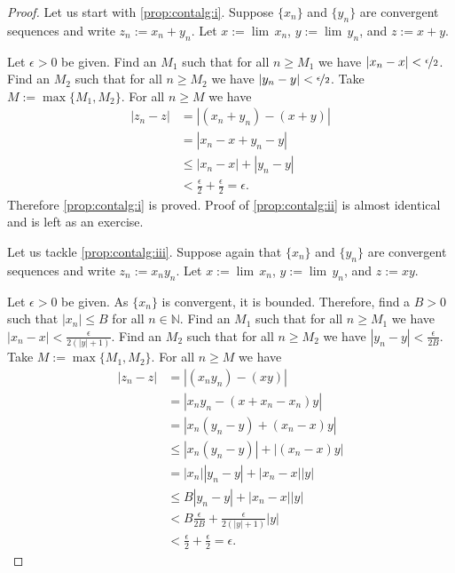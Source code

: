 \documentclass[12pt]{book}
\newcommand{\abs}[1]{\left\lvert {#1} \right\rvert}
\newcommand{\N}{{\mathbb{N}}}
\theoremstyle{plain}
\theoremstyle{remark}
\theoremstyle{definition}
\theoremstyle{exercise}
\theoremstyle{example}
\begin{document}
\begin{proof}
Let us start with \ref{prop:contalg:i}.
Suppose $\{ x_n \}$ and $\{ y_n \}$ are convergent sequences and
write $z_n := x_n + y_n$.  Let $x := \lim\, x_n$,
$y := \lim\, y_n$, and $z := x+y$.

Let $\epsilon > 0$ be given.  
Find an $M_1$ such that for all $n \geq M_1$
we have
$\abs{x_n - x} < \nicefrac{\epsilon}{2}$.  
Find an $M_2$ such that for all $n \geq M_2$
we have
$\abs{y_n - y} < \nicefrac{\epsilon}{2}$.  Take $M := \max \{ M_1, M_2 \}$.
For all $n \geq M$ we have
\begin{equation*}
\begin{split}
\abs{z_n - z} &=
\abs{(x_n+y_n) - (x+y)} \\
& =
\abs{x_n-x + y_n-y} \\
& \leq
\abs{x_n-x} + \abs{y_n-y} \\
& <
\frac{\epsilon}{2} +
\frac{\epsilon}{2}
= \epsilon.
\end{split}
\end{equation*}
Therefore \ref{prop:contalg:i} is proved.
Proof of \ref{prop:contalg:ii} is almost identical and is left as an
exercise.

Let us tackle 
\ref{prop:contalg:iii}.
Suppose again that $\{ x_n \}$ and $\{ y_n \}$ are convergent sequences and
write $z_n := x_n y_n$.  Let $x := \lim\, x_n$,
$y := \lim\, y_n$, and $z := xy$.

Let $\epsilon > 0$ be given.
As $\{ x_n \}$ is convergent, it is bounded.  Therefore, find
a $B >0$ such that $\abs{x_n} \leq B$ for all $n \in \N$.
Find an $M_1$ such that for all $n \geq M_1$
we have
$\abs{x_n - x} < \frac{\epsilon}{2(\abs{y}+1)}$.  
Find an $M_2$ such that for all $n \geq M_2$
we have
$\abs{y_n - y} < \frac{\epsilon}{2B}$.  Take $M := \max \{ M_1, M_2 \}$.
For all $n \geq M$ we have
\begin{equation*}
\begin{split}
\abs{z_n - z} &=
\abs{(x_ny_n) - (xy)} \\
& =
\abs{x_ny_n - (x+x_n-x_n)y} \\
& =
\abs{x_n(y_n -y) + (x_n - x)y} \\
& \leq
\abs{x_n(y_n -y)} + \abs{(x_n - x)y} \\
& =
\abs{x_n}\abs{y_n -y} + \abs{x_n - x}\abs{y} \\
& \leq
B\abs{y_n -y} + \abs{x_n - x}\abs{y} \\
& <
B\frac{\epsilon}{2B} + \frac{\epsilon}{2(\abs{y}+1)}\abs{y}
\\
& <
\frac{\epsilon}{2} + \frac{\epsilon}{2} = \epsilon .
\end{split}
\end{equation*}


\end{proof}
\end{document}
